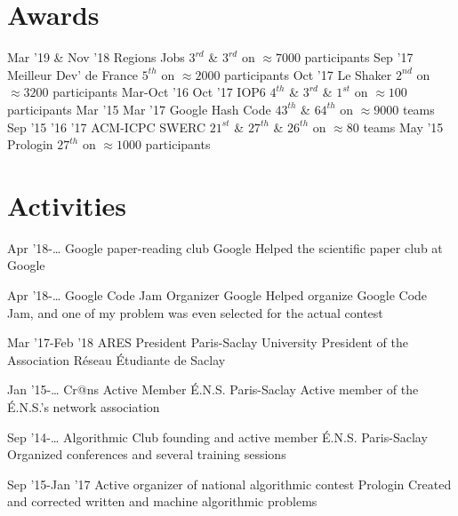 \documentclass[letterpaper]{twentysecondcv} %
\begin{document}
\section{Awards}
\begin{twentymedium}
   \twentyitemmedium
	{Mar '19 \& Nov '18}
	{Regions Jobs}
	{$3^{rd}$ \& $3^{rd}$ on $\approx 7000$ participants}
   \twentyitemmedium
    	{Sep '17}
	{Meilleur Dev' de France}
        {$5^{th}$ on $\approx 2000$ participants}
   \twentyitemmedium
    	{Oct '17}
	{Le Shaker}
        {$2^{nd}$ on $\approx 3200$ participants}
   \twentyitemmedium
	{Mar-Oct '16 Oct '17}
        {IOP6}
	{$4^{th}$ \& $3^{rd}$ \& $1^{st}$ on $\approx 100$ participants}
    \twentyitemmedium
    	{Mar '15 Mar '17}
        {Google Hash Code}
        {$43^{th}$ \& $64^{th}$ on $\approx 9000$ teams}
   \twentyitemmedium
	{Sep '15 '16 '17}
        {ACM-ICPC SWERC}
	{$21^{st}$  \& $27^{th}$ \& $26^{th}$ on $\approx 80$ teams}
   \twentyitemmedium
    	{May '15}
        {Prologin}
        {$27^{th}$ on $\approx 1000$ participants}
   
\end{twentymedium}

\section{Activities}

\begin{twenty} %

    \twentyitem
	{Apr '18-…}
        {Google paper-reading club}
        {Google}
        {}
        {Helped the scientific paper club at Google}

    \twentyitem
	{Apr '18-…}
        {Google Code Jam Organizer}
        {Google}
        {}
        {Helped organize Google Code Jam, and one of my problem was even selected for the actual contest}

    \twentyitem
	{Mar '17-Feb '18}
        {ARES President}
        {Paris-Saclay University}
        {}
        {President of the Association Réseau Étudiante de Saclay}

    \twentyitem
    	{Jan '15-…}
        {Cr@ns Active Member}
        {É.N.S. Paris-Saclay}
        {}
        {Active member of the É.N.S.'s network association}
        
    \twentyitem
   	{Sep '14-…}
        {Algorithmic Club founding and active member}
        {É.N.S. Paris-Saclay}
        {}
        {Organized conferences and several training sessions}
        
     \twentyitem
   	{Sep '15-Jan '17}
        {Active organizer of national algorithmic contest}
        {Prologin}
        {}
        {Created and corrected written and machine algorithmic problems}
        
        
\end{twenty}
\end{document}
